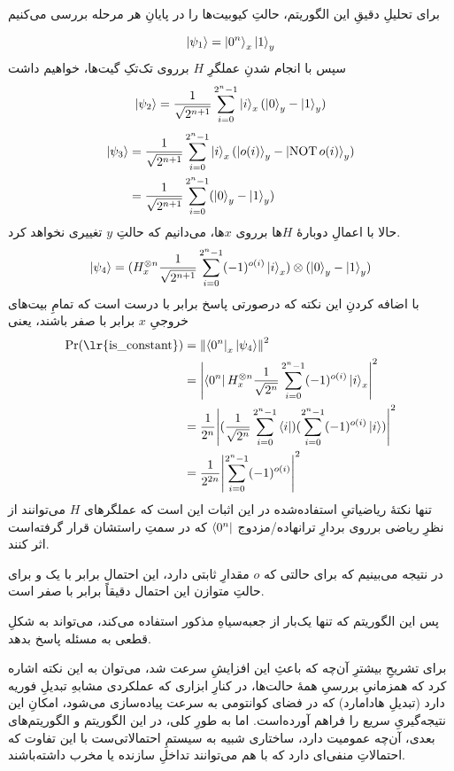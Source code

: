 برای تحلیلِ دقیقِ این الگوریتم، حالتِ کیوبیت‌ها را در پایانِ هر مرحله بررسی می‌کنیم

\begin{equation}
    \ket{\psi_1} = \ket{0^n}_x \ket{1}_y
\end{equation}
سپس با انجام شدنِ عملگرِ \(H\) برروی تک‌تکِ گیت‌ها، خواهیم داشت
\begin{equation}
    \ket{\psi_2} = \frac{1}{\sqrt{2^{n+1}}}\sum_{i = 0}^{2^n - 1} \ket{i}_x (\ket{0}_y - \ket{1}_y)
\end{equation}
\begin{align}
    \ket{\psi_3} &= \frac{1}{\sqrt{2^{n+1}}}\sum_{i = 0}^{2^n - 1} \ket{i}_x (\ket{o(i)}_y - \ket{\operatorname{NOT} o(i)}_y) \\
     &= \frac{1}{\sqrt{2^{n+1}}}\sum_{i = 0}^{2^n - 1}(\ket{0}_y - \ket{1}_y)
\end{align}
حالا با اعمالِ دوبارهٔ \(H\)ها برروی \(x\)ها، می‌دانیم که حالتِ \(y\) تغییری نخواهد کرد.
\begin{equation}
    \ket{\psi_4} = (H^{\otimes n}_x \frac{1}{\sqrt{2^{n+1}}}\sum_{i = 0}^{2^n - 1}  (-1)^{o(i)}\ket{i}_x ) \otimes (\ket{0}_y - \ket{1}_y)
\end{equation}
با اضافه کردنِ این نکته که درصورتی پاسخ 
برابر با درست است که تمامِ بیت‌های خروجیِ \(x\) برابر با صفر باشند، یعنی
\begin{align}
    \Pr(\text{\lr{\lstinline{is_constant}}}) &= \norm{\bra{0^n}_x \ket{\psi_4}}^2 \\
     &= \abs{\bra{0^n}H^{\otimes n}_x \frac{1}{\sqrt{2^{n}}}\sum_{i = 0}^{2^n - 1}  (-1)^{o(i)}\ket{i}_x}^2 \\
     &= \frac{1}{2^n}\abs{(\frac{1}{\sqrt{2^{n}}}\sum_{i = 0}^{2^n - 1} \bra{i}) (\sum_{i = 0}^{2^n - 1}  (-1)^{o(i)}\ket{i})}^2 \\
     &= \frac{1}{2^{2n}}\abs{\sum_{i = 0}^{2^n - 1} (-1)^{o(i)}}^2
\end{align}
تنها نکتهٔ ریاضیاتیِ استفاده‌شده در این اثبات این است که عملگرهای \(H\) می‌توانند از نظرِ ریاضی برروی بردارِ ترانهاده/مزدوج 
\( \bra{0^n} \)
که در سمتِ راستشان قرار گرفته‌است اثر کنند.

در نتیجه می‌بینیم که برای حالتی که \(o\) مقدارِ ثابتی دارد، این احتمال برابر با یک و برای حالتِ متوازن این احتمال دقیقاً برابر با صفر است.

پس این الگوریتم که تنها یک‌بار از جعبه‌سیاهِ مذکور استفاده می‌کند، می‌تواند به شکلِ قطعی به مسئله پاسخ بدهد.

برای تشریحِ بیشترِ آن‌چه که باعثِ این افزایشِ سرعت شد، می‌توان به این نکته اشاره کرد که همزمانیِ بررسیِ همهٔ حالت‌ها، در کنارِ ابزاری که عملکردی مشابهِ تبدیلِ فوریه دارد (تبدیلِ هادامارد) که در فضای کوانتومی به سرعت پیاده‌سازی می‌شود، امکانِ این نتیجه‌گیریِ سریع را فراهم آورده‌است. اما به طورِ کلی، در این الگوریتم و الگوریتم‌های بعدی، آن‌چه عمومیت دارد، ساختاری شبیه به سیستمِ احتمالاتی‌ست با این تفاوت که احتمالاتِ منفی‌ای دارد که با هم می‌توانند تداخلِ سازنده یا مخرب داشته‌باشند.

